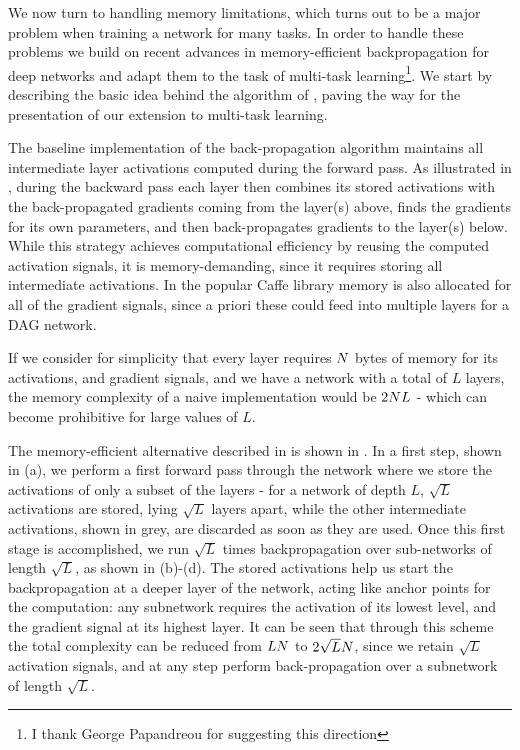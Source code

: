 \documentclass[10pt,twocolumn,letterpaper]{article}
\begin{document}
\label{memory}

We now turn to handling memory limitations, which turns out to be a  major problem when  training a network for many tasks. In order to handle these problems we build on recent advances in memory-efficient backpropagation for deep networks \cite{GruslysMDLG16,ChenXZG16} and adapt them to the task of multi-task learning\footnote{I thank George Papandreou for suggesting this direction}. 
We start by describing the basic idea behind the algorithm of \cite{ChenXZG16}, paving the way for the presentation of our extension to multi-task learning.
 
The baseline implementation of the back-propagation algorithm maintains all intermediate layer activations computed  during the forward pass. As illustrated in , 
during  the backward pass each layer then combines its stored activations  with the back-propagated gradients coming from the layer(s) above, finds the gradients for its own parameters, and then back-propagates  gradients to the layer(s) below.
While this strategy achieves computational efficiency by reusing the computed activation signals, it is memory-demanding, since it requires storing all intermediate activations. In the popular Caffe \cite{caffe} library memory is also allocated for all of the gradient signals, since a priori these could feed into multiple layers for a DAG network.

\newcommand{\nl}{L}


If we consider for simplicity that every layer requires $N$ bytes of memory for its activations, and gradient signals, and  we have a network with a total of $\nl$ layers,  the memory complexity of a naive implementation would be $2 \nbytes \nl$ - which can become prohibitive for large values of $\nl$. 


The memory-efficient alternative described in \cite{ChenXZG16} is shown in . 
In a first step, shown in (a), we perform a 
first forward pass through the network where we store the activations of only a subset of the layers - for a network of depth $\nl$, $\sqrt{\nl}$ activations are stored, lying $\sqrt{\nl}$ layers apart, while the other intermediate activations, shown in grey, are discarded as soon as they are used. 
 Once this first stage is accomplished, we run $\sqrt{\nl}$ times backpropagation over sub-networks of length $\sqrt{\nl}$, as shown in (b)-(d). The stored activations help us start the backpropagation at a deeper layer of the network, acting like anchor points for the computation: any subnetwork requires the activation of its lowest level, and the gradient signal at its highest layer. 
 It can be seen that through this scheme the total complexity can be reduced from $\nl\nbytes$ to $2 \sqrt{\nl} \nbytes$, since we retain $\sqrt{\nl}$ activation signals, and at any step perform back-propagation over a subnetwork of length $\sqrt{\nl}$.
 
\end{document}
